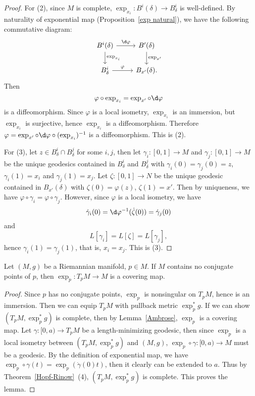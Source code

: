 \begin{proof}
    For (2), since $M$ is complete, $\exp_{x_i}:B^i(\delta)\to B^i_\delta$ is well-defined.
    By naturality of exponential map (Proposition~\ref{exp natural}), we have the following commutative diagram:
    \[\begin{tikzcd}
        B^i(\delta) \ar[r, "{\d\varphi}"] \ar[d, "{\exp_{x_i}}"] & B'(\delta) \ar[d, "{\exp_{x'}}"] \\
        B^i_\delta \ar[r, "\varphi"] & B_{x'}(\delta).
    \end{tikzcd}\]
    Then
    \[\varphi\circ\exp_{x_i}=\exp_{x'}\circ\d\varphi\]
    is a diffeomorphism.
    Since $\varphi$ is a local isometry, $\exp_{x_i}$ is an immersion, but $\exp_{x_i}$ is surjective, hence $\exp_{x_i}$ is a diffeomorphism.
    Therefore $\varphi=\exp_{x'}\circ\d\varphi\circ(\exp_{x_i})^{-1}$ is a diffeomorphism.
    This is (2).

    For (3), let $z\in B^i_\delta\cap B^j_\delta$ for some $i,j$, then let $\gamma_i:[0,1]\to M$ and $\gamma_j:[0,1]\to M$ be the unique geodesics contained in $B^i_\delta$ and $B^j_\delta$ with $\gamma_i(0)=\gamma_j(0)=z$, $\gamma_i(1)=x_i$ and $\gamma_j(1)=x_j$.
    Let $\zeta:[0,1]\to N$ be the unique geodesic contained in $B_{x'}(\delta)$ with $\zeta(0)=\varphi(z)$, $\zeta(1)=x'$.
    Then by uniqueness, we have $\varphi\circ\gamma_i=\varphi\circ\gamma_j$.
    However, since $\varphi$ is a local isometry, we have
    \[\dot\gamma_i(0)=\d\varphi^{-1}(\dot\zeta(0))=\dot\gamma_j(0)\]
    and
    \[L[\gamma_i]=L[\zeta]=L[\gamma_j],\]
    hence $\gamma_i(1)=\gamma_j(1)$, that is, $x_i=x_j$.
    This is (3).
\end{proof}

\begin{lem}\label{C-H 1}
    Let $(M,g)$ be a Riemannian manifold, $p\in M$.
    If $M$ contains no conjugate points of $p$, then $\exp_p:T_pM\to M$ is a covering map.
\end{lem}
\begin{proof}
    Since $p$ has no conjugate points, $\exp_p$ is nonsingular on $T_pM$, hence is an immersion.
    Then we can equip $T_pM$ with pullback metric $\exp_p^*g$.
    If we can show $(T_pM,\exp_p^*g)$ is complete, then by Lemma~\ref{Ambrose}, $\exp_p$ is a covering map.
    Let $\gamma:[0,a)\to T_pM$ be a length-minimizing geodesic, then since $\exp_p$ is a local isometry between $(T_pM,\exp_p^*g)$ and $(M,g)$, $\exp_p\circ\gamma:[0,a)\to M$ must be a geodesic.
    By the definition of exponential map, we have $\exp_p\circ\gamma(t)=\exp_p(\dot\gamma(0)t)$, then it clearly can be extended to $a$.
    Thus by Theorem~\ref{Hopf-Rinow}~(4), $(T_pM,\exp_p^*g)$ is complete.
    This proves the lemma.
\end{proof}

